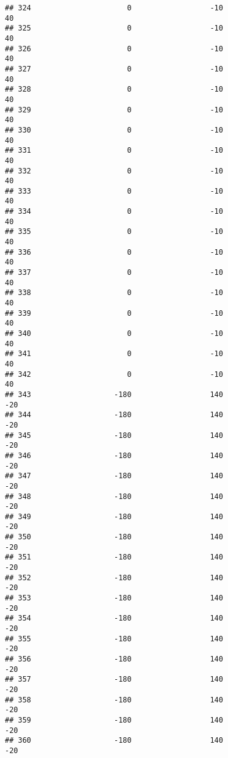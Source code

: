 \documentclass[]{article}
\begin{document}
\begin{verbatim}
## 324                      0                  -10                   40
## 325                      0                  -10                   40
## 326                      0                  -10                   40
## 327                      0                  -10                   40
## 328                      0                  -10                   40
## 329                      0                  -10                   40
## 330                      0                  -10                   40
## 331                      0                  -10                   40
## 332                      0                  -10                   40
## 333                      0                  -10                   40
## 334                      0                  -10                   40
## 335                      0                  -10                   40
## 336                      0                  -10                   40
## 337                      0                  -10                   40
## 338                      0                  -10                   40
## 339                      0                  -10                   40
## 340                      0                  -10                   40
## 341                      0                  -10                   40
## 342                      0                  -10                   40
## 343                   -180                  140                  -20
## 344                   -180                  140                  -20
## 345                   -180                  140                  -20
## 346                   -180                  140                  -20
## 347                   -180                  140                  -20
## 348                   -180                  140                  -20
## 349                   -180                  140                  -20
## 350                   -180                  140                  -20
## 351                   -180                  140                  -20
## 352                   -180                  140                  -20
## 353                   -180                  140                  -20
## 354                   -180                  140                  -20
## 355                   -180                  140                  -20
## 356                   -180                  140                  -20
## 357                   -180                  140                  -20
## 358                   -180                  140                  -20
## 359                   -180                  140                  -20
## 360                   -180                  140                  -20

\end{verbatim}
\end{document}
